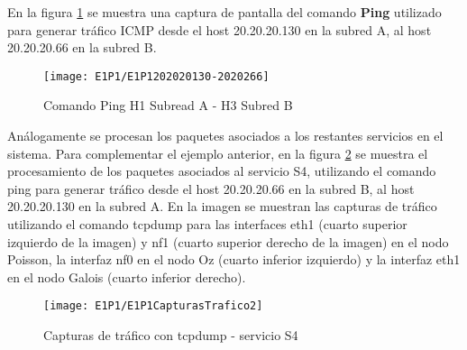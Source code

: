 En la figura \ref{fig:LabE1P1CapHost} se muestra una captura de pantalla del comando \textbf{Ping} utilizado para generar tr\'afico ICMP desde el host 20.20.20.130 en la subred A, al host 20.20.20.66 en la subred B.\\

\begin{figure}[h!] 
\centering    
\texttt{[image: E1P1/E1P1202020130-2020266]}
\caption[Comando Ping H1 Subread A - H3 Subred B]{Comando Ping H1 Subread A - H3 Subred B}
\label{fig:LabE1P1CapHost}
\end{figure}

Análogamente se procesan los paquetes asociados a los restantes servicios en el sistema. Para complementar el ejemplo anterior, en la figura \ref{fig:LabE1P1CapsTraf2} se muestra el procesamiento de los paquetes asociados al servicio S4, utilizando el comando ping para generar tr\'afico desde el host 20.20.20.66 en la subred B, al host 20.20.20.130 en la subred A. En la imagen se muestran las capturas de tr\'afico utilizando el comando tcpdump para las interfaces eth1 (cuarto superior izquierdo de la imagen) y nf1 (cuarto superior derecho de la imagen) en el nodo Poisson, la interfaz nf0 en el nodo Oz (cuarto inferior izquierdo) y la interfaz eth1 en el nodo Galois (cuarto inferior derecho).\\


\begin{figure}[h!] 
\centering    
\texttt{[image: E1P1/E1P1CapturasTrafico2]}
\caption[Capturas de tr\'afico con tcpdump - servicio S4]{Capturas de tr\'afico con tcpdump - servicio S4}
\label{fig:LabE1P1CapsTraf2}
\end{figure}



